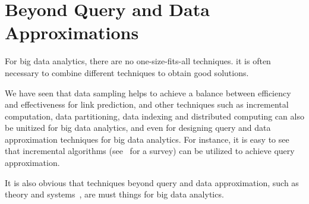 \section{Beyond Query and Data Approximations}
\label{sec-beyond}

  For big data analytics, there are no one-size-fits-all techniques.  it is often necessary to combine different techniques to obtain good solutions.


We have seen that data sampling helps to achieve a balance between efficiency and effectiveness for link prediction,
and other techniques such as incremental computation, data partitioning, data indexing and distributed computing can
also be unitized for big data analytics, and even for designing query and data approximation techniques for big data analytics.
For instance, it is easy to see that incremental algorithms (see~\cite{Reps96} for a survey) can be utilized to achieve query approximation.

It is also obvious that techniques beyond query and data approximation, such as theory and systems~\cite{FanGN13,Jordan15,ZahariaXWDADMRV16}, are must things for big data analytics.

